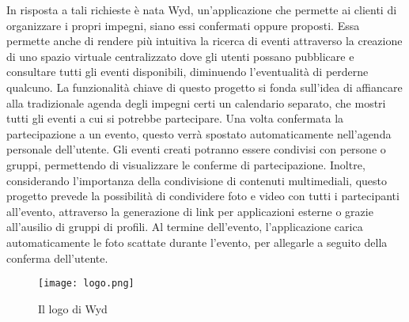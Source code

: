 \clearpage
In risposta a tali richieste è nata Wyd, un'applicazione che permette ai clienti di organizzare i propri impegni, siano essi confermati oppure proposti. Essa permette anche di rendere più intuitiva la ricerca di eventi attraverso la creazione di uno spazio virtuale centralizzato dove gli utenti possano pubblicare e consultare tutti gli eventi disponibili, diminuendo l’eventualità di perderne qualcuno. 
La funzionalità chiave di questo progetto si fonda sull'idea di affiancare alla tradizionale agenda degli impegni certi un calendario separato, che mostri tutti gli eventi a cui si potrebbe partecipare. Una volta confermata la partecipazione a un evento, questo verrà spostato automaticamente nell'agenda personale dell'utente.
Gli eventi creati potranno essere condivisi con persone o gruppi, permettendo di visualizzare le conferme di partecipazione. 
Inoltre, considerando l'importanza della condivisione di contenuti multimediali, questo progetto prevede la possibilità di condividere foto e video con tutti i partecipanti all'evento, attraverso la generazione di link per applicazioni esterne o grazie all'ausilio di gruppi di profili. Al termine dell’evento,
l'applicazione carica automaticamente le foto scattate durante l'evento,
per allegarle a seguito della conferma dell'utente.\\


\begin{figure}[h!]
    \centering
    \texttt{[image: logo.png]}
    \caption{Il logo di Wyd}
\end{figure}	

\clearpage

